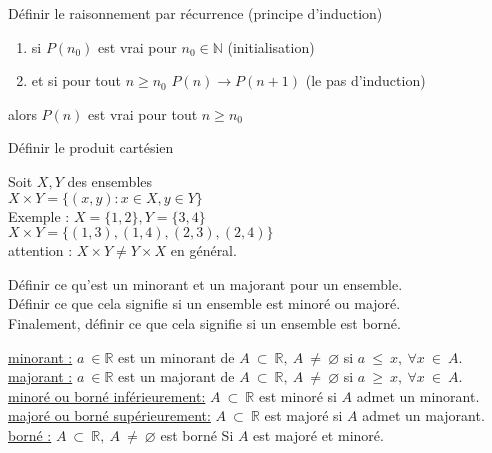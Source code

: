 \documentclass[12pt]{article}
\newcommand*{\xfield}[1]{\begin{mdframed}\centering #1\end{mdframed}\bigskip}
\newenvironment{note}{}{}
\begin{document}
\begin{note}
	\xfield{Définir le raisonnement par récurrence (principe d'induction)}
	\xfield{\begin{enumerate}
	\item si $P(n_0)$ est vrai pour $n_0 \in \mathbb{N}$ (initialisation)
	\item et si pour tout $n \ge n_0$ $P(n) \rightarrow P(n+1)$ (le pas d'induction)
	\end{enumerate}
	alors $P(n)$ est vrai pour tout $n \ge n_0$}
\end{note}
\begin{note}
	\xfield{Définir le produit cartésien}
	\xfield{Soit $X,Y$ des ensembles \\
	$X \times Y = \{ (x,y) : x \in X, y \in Y \} $\\
	Exemple : $X = \{ 1,2 \} , Y = \{ 3,4 \} $\\
	$X \times Y = \{ (1,3),(1,4),(2,3),(2,4)\}$ \\
	attention : $X \times Y \neq Y \times X$ en général.}
\end{note}
\begin{note}
    \xfield{
        Définir ce qu'est un minorant et un majorant pour un ensemble.\\
        Définir ce que cela signifie si un ensemble est minoré ou majoré.\\
        Finalement, définir ce que cela signifie si un ensemble est borné.}
    \xfield{
        \underline{minorant :} $a\ \in \mathbb{R}$ est un minorant de $A\ \subset\ \mathbb{R},\ A\ \neq\ \varnothing$ si $a\ \le\ x,\ \forall x\ \in\ A$.\\        
        \underline{majorant :} $a\ \in \mathbb{R}$ est un majorant de $A\ \subset\ \mathbb{R},\ A\ \neq\ \varnothing$ si $a\ \ge\ x,\ \forall x\ \in\ A$.\\
        \underline{minoré ou borné inférieurement:} $A\ \subset\ \mathbb{R}$ est minoré si $A$ admet un minorant.\\
        \underline{majoré ou borné supérieurement:} $A\ \subset\ \mathbb{R}$ est majoré si $A$ admet un majorant.\\
        \underline{borné :} $A\ \subset\ \mathbb{R},\ A\ \neq\ \varnothing$ est borné Si $A$ est majoré et minoré.}
\end{note}
\end{document}
